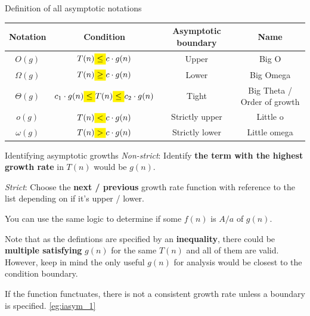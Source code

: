 \begin{definition}
    {Definition of all asymptotic notations}
    \begin{tabular}{|c|c|c|c|}
        \hline
        \textbf{Notation} & \textbf{Condition}                                                                         & \textbf{Asymptotic boundary} & \textbf{Name}               \\ \hline
        $O(g)$            & $T(n) \mathcolorbox{yellow}{\leq} c\cdot g(n)$                                             & Upper                        & Big O                       \\
        $\Omega(g)$       & $T(n) \mathcolorbox{yellow}{\geq} c\cdot g(n)$                                             & Lower                        & Big Omega                   \\
        $\Theta(g)$       & $ c_1\cdot g(n)\mathcolorbox{yellow}{\leq} T(n) \mathcolorbox{yellow}{\leq} c_2\cdot g(n)$ & Tight                        & Big Theta / Order of growth \\
        $o(g)$            & $T(n) \mathcolorbox{yellow}{<} c\cdot g(n)$                                                & Strictly upper               & Little o                    \\
        $\omega(g)$       & $T(n) \mathcolorbox{yellow}{>} c\cdot g(n)$                                                & Strictly lower               & Little omega                \\ \hline
    \end{tabular}
\end{definition}

\begin{theorem}
    {Identifying asymptotic growths}
    \textit{Non-strict}: Identify \textbf{the term with the highest growth rate} in $T(n)$ would be $g(n)$.

    \textit{Strict}: Choose the \textbf{next / previous} growth rate function with reference to the list depending on if it's upper / lower.

    You can use the same logic to determine if some $f(n)$ is $A/a$ of $g(n)$.

    Note that as the defintions are specified by an \textbf{inequality}, there could be \textbf{multiple satisfying} $g(n)$ for the same $T(n)$ and all of them are valid. However, keep in mind the only useful $g(n)$ for analysis would be closest to the condition boundary.

    If the function functuates, there is not a consistent growth rate unless a boundary is specified.
    \tcblower
    \label{thm:iasym}
    \ref{eg:iasym_1}
\end{theorem}

